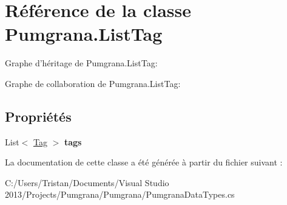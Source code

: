 \hypertarget{class_pumgrana_1_1_list_tag}{\section{Référence de la classe Pumgrana.\+List\+Tag}
\label{class_pumgrana_1_1_list_tag}
}


Graphe d'héritage de Pumgrana.\+List\+Tag\+:


Graphe de collaboration de Pumgrana.\+List\+Tag\+:
\subsection*{Propriétés}
\begin{DoxyCompactItemize}
\item 
\hypertarget{class_pumgrana_1_1_list_tag_af9ed4af22421a2ab09a3035a0640ef2a}{List$<$ \hyperlink{class_pumgrana_1_1_tag}{Tag} $>$ {\bfseries tags}}\label{class_pumgrana_1_1_list_tag_af9ed4af22421a2ab09a3035a0640ef2a}

\end{DoxyCompactItemize}


La documentation de cette classe a été générée à partir du fichier suivant \+:\begin{DoxyCompactItemize}
\item 
C\+:/\+Users/\+Tristan/\+Documents/\+Visual Studio 2013/\+Projects/\+Pumgrana/\+Pumgrana/Pumgrana\+Data\+Types.\+cs\end{DoxyCompactItemize}

